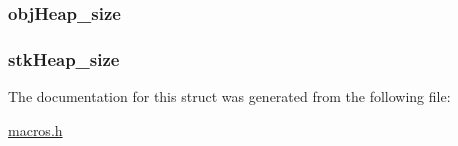 \subsubsection[{obj\+Heap\+\_\+size}]{ obj\+Heap\+\_\+size}\label{structdata_m_size__t_ad0752dbc8eb091b917dcbf1dee42d4b1}
\hypertarget{structdata_m_size__t_a057c7536c63c45165af2cb634abe052f}{}
\subsubsection[{stk\+Heap\+\_\+size}]{ stk\+Heap\+\_\+size}\label{structdata_m_size__t_a057c7536c63c45165af2cb634abe052f}


The documentation for this struct was generated from the following file\+:\begin{DoxyCompactItemize}
\item 
\hyperlink{macros_8h}{macros.\+h}\end{DoxyCompactItemize}
